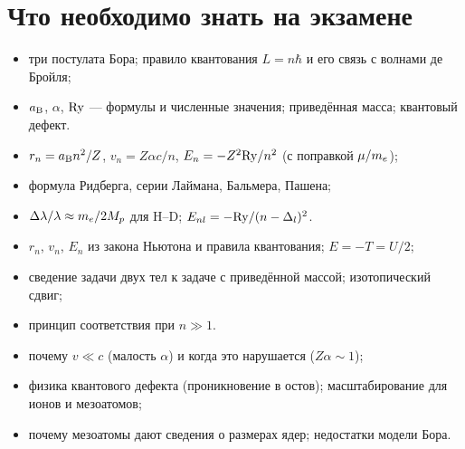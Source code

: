 \section{Что необходимо знать на экзамене}

\begin{examcheck}
\begin{itemize}
 \item три постулата Бора; правило квантования $L=n\hbar$ и его связь с волнами де Бройля;
 \item $a_{\mathrm B}$, $\alpha$, $\mathrm{Ry}$ — формулы и численные значения; приведённая масса; квантовый дефект.
\end{itemize}
\begin{itemize}
 \item $r_n=a_{\mathrm B} n^2/Z$, $v_n=Z\alpha c/n$, $E_n=-Z^2\mathrm{Ry}/n^2$ (с поправкой $\mu/m_e$);
 \item формула Ридберга, серии Лаймана, Бальмера, Пашена;
 \item $\Delta\lambda/\lambda\approx m_e/2M_p$ для H--D; $E_{nl}=-\mathrm{Ry}/(n-\Delta_l)^2$.
\end{itemize}
\begin{itemize}
 \item $r_n$, $v_n$, $E_n$ из закона Ньютона и правила квантования; $E=-T=U/2$;
 \item сведение задачи двух тел к задаче с приведённой массой; изотопический сдвиг;
 \item принцип соответствия при $n\gg1$.
\end{itemize}
\begin{itemize}
 \item почему $v\ll c$ (малость $\alpha$) и когда это нарушается ($Z\alpha\sim1$);
 \item физика квантового дефекта (проникновение в остов); масштабирование для ионов и мезоатомов;
 \item почему мезоатомы дают сведения о размерах ядер; недостатки модели Бора.
\end{itemize}
\end{examcheck}
